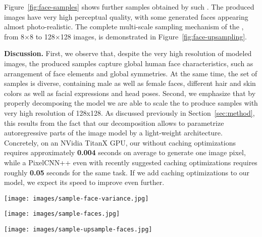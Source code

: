 Figure~\ref{fig:face-samples} shows further samples obtained by such 
\emph{\SAMPLING}. 
The produced images have very high perceptual quality, with some generated 
faces appearing almost photo-realistic.
The complete multi-scale sampling mechanism of the \PYRAMID, from 
8$\times$8 to 128$\times$128 images, is demonstrated in Figure~\ref{fig:face-upsampling}. 

\textbf{Discussion.} First, we observe that, despite the very high 
resolution of modeled images, the produced samples capture global human 
face characteristics, such as arrangement of face elements and global 
symmetries. At the same time, the set of samples is diverse, containing 
male as well as female faces, different hair and skin colors as well 
as facial expressions and head poses. 
Second, we emphasize that by properly decomposing the model we are 
able to scale the \PYRAMID to produce samples with very high 
resolution of 128x128.
As discussed previously in Section~\ref{sec:method}, this results from 
the fact that our decomposition allows to parametrize autoregressive 
parts of the image model by a light-weight architecture.
Concretely, on an NVidia TitanX GPU, our \PYRAMID without 
caching optimizations requires approximately \textbf{0.004} seconds 
on average to generate one image pixel, while a PixelCNN++ even with 
recently suggested caching optimizations requires roughly \textbf{0.05} 
seconds for the same task.
If we add caching optimizations to our model, we expect its speed to
improve even further.

\begin{figure*}
    \center
	\texttt{[image: images/sample-face-variance.jpg]}
	\caption{Effect of the variance reduction. Numbers on top of each column indicates the amount of reduction
             in the predicted log-variance of the mixture components. The last column corresponds to \SAMPLING.}
    \label{fig:face-variance}
\end{figure*}

\begin{figure*}
    \center
	\texttt{[image: images/sample-faces.jpg]}
	\caption{Images sampled from the \PYRAMID by \SAMPLING. The generated faces are of very high quality,
    many being close to photorealistic. At the same time, the set of sample is diverse in terms of the depicted 
    gender, skin color and head pose.}
    \label{fig:face-samples}
\end{figure*}

\begin{figure*}
    \center
	\texttt{[image: images/sample-upsample-faces.jpg]}
	\caption{Visualization of the \PYRAMID sampling process. Faces are first generated on a small, 8x8, resolution
             and then are gradually upsampled until reaching the desired 128x128 resolution.}
    \label{fig:face-upsampling}
\end{figure*}
